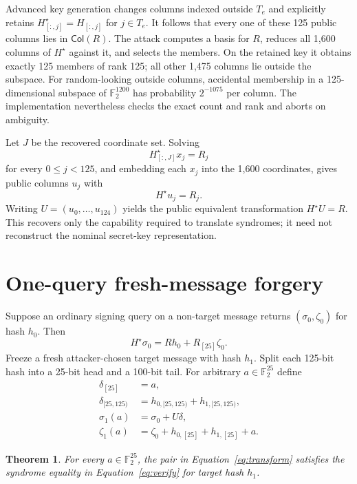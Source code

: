 \documentclass[10pt,a4paper]{article}
\newtheorem{theorem}{Theorem}
\newcommand{\F}{\mathbb{F}}
\newcommand{\Col}{\mathsf{Col}}
\begin{document}
Advanced key generation changes columns indexed outside $T_e$ and explicitly
retains $H^\star_{[:,j]}=H_{[:,j]}$ for $j\in T_e$. It follows that every one
of these 125 public columns lies in $\Col(R)$. The attack computes a basis for
$R$, reduces all 1,600 columns of $H^\star$ against it, and selects the
members. On the retained key it obtains exactly 125 members of rank 125; all
other 1,475 columns lie outside the subspace. For random-looking outside
columns, accidental membership in a 125-dimensional subspace of
$\F_2^{1200}$ has probability $2^{-1075}$ per column. The implementation
nevertheless checks the exact count and rank and aborts on ambiguity.

Let $J$ be the recovered coordinate set. Solving
\[
  H^\star_{[:,J]}x_j=R_j
\]
for every $0\le j<125$, and embedding each $x_j$ into the 1,600 coordinates,
gives public columns $u_j$ with
\begin{equation}
  H^\star u_j=R_j.
  \label{eq:recovered}
\end{equation}
Writing $U=(u_0,\ldots,u_{124})$ yields the public equivalent transformation
$H^\star U=R$. This recovers only the capability required to translate
syndromes; it need not reconstruct the nominal secret-key representation.

\section{One-query fresh-message forgery}

Suppose an ordinary signing query on a non-target message returns
$(\sigma_0,\zeta_0)$ for hash $h_0$. Then
\begin{equation}
  H^\star\sigma_0=Rh_0+R_{[25]}\zeta_0.
\end{equation}
Freeze a fresh attacker-chosen target message with hash $h_1$. Split each
125-bit hash into a 25-bit head and a 100-bit tail. For arbitrary
$a\in\F_2^{25}$ define
\begin{align}
  \delta_{[25]} &= a,\\
  \delta_{[25,125)} &= h_{0,[25,125)}+h_{1,[25,125)},\\
  \sigma_1(a) &= \sigma_0+U\delta,\\
  \zeta_1(a) &= \zeta_0+h_{0,[25]}+h_{1,[25]}+a.
  \label{eq:transform}
\end{align}

\begin{theorem}
For every $a\in\F_2^{25}$, the pair in
Equation~\eqref{eq:transform} satisfies the syndrome equality in
Equation~\eqref{eq:verify} for target hash $h_1$.
\end{theorem}
\end{document}
